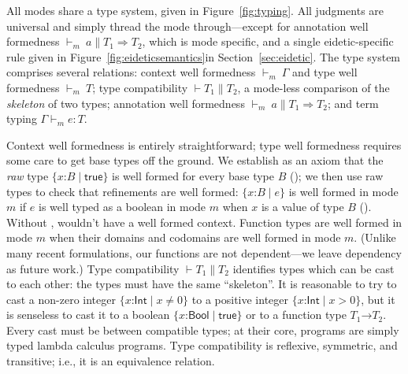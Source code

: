 \documentclass[9pt]{extarticle}
\newcommand{\ottnt}[1]{\mathit{#1}}
\newcommand{\ottsym}[1]{#1}
\begin{document}
All modes share a type system, given in
Figure~\ref{fig:typing}.
All judgments are universal and simply thread the mode
through---except for annotation well formedness $ \mathord{  \vdash _{ \ottnt{m} } }~ \ottnt{a}   \mathrel{\parallel}   \ottnt{T_{{\mathrm{1}}}}  \Rightarrow  \ottnt{T_{{\mathrm{2}}}} $, which is mode specific, and a single eidetic-specific rule
given in Figure~\ref{fig:eideticsemantics}\iffull in
Section~\ref{sec:eidetic}\fi.
The type system comprises several relations:
context well formedness $ \mathord{  \vdash _{ \ottnt{m} } }~ \Gamma $ and type well formedness $ \mathord{  \vdash _{ \ottnt{m} } }~ \ottnt{T} $; type compatibility $\vdash  \ottnt{T_{{\mathrm{1}}}}  \mathrel{\parallel}  \ottnt{T_{{\mathrm{2}}}}$, a mode-less comparison of
the \textit{skeleton} of two types; annotation well formedness $ \mathord{  \vdash _{ \ottnt{m} } }~ \ottnt{a}   \mathrel{\parallel}   \ottnt{T_{{\mathrm{1}}}}  \Rightarrow  \ottnt{T_{{\mathrm{2}}}} $; and term typing $ \Gamma   \vdash _{ \ottnt{m} }  \ottnt{e}  :  \ottnt{T} $.


Context well formedness is entirely straightforward; type well
formedness requires some care to get base types off the ground.
We establish as an axiom that the \textit{raw} type $ \{ \mathit{x} \mathord{:} \ottnt{B} \mathrel{\mid}  \mathsf{true}  \} $
  is well formed for every base type $\ottnt{B}$ (); we then use
  raw types to check that refinements are well formed: $ \{ \mathit{x} \mathord{:} \ottnt{B} \mathrel{\mid} \ottnt{e} \} $
  is well formed in mode $\ottnt{m}$ if $\ottnt{e}$ is well typed as a boolean
  in mode $\ottnt{m}$ when $\mathit{x}$ is a value of type $\ottnt{B}$
  (). Without ,  wouldn't have a well
  formed context. Function types are well formed in mode $\ottnt{m}$ when
  their domains and codomains are well formed in mode $\ottnt{m}$. (Unlike
  many recent formulations, our functions are not dependent---we leave
  dependency as future work.) 
Type compatibility $\vdash  \ottnt{T_{{\mathrm{1}}}}  \mathrel{\parallel}  \ottnt{T_{{\mathrm{2}}}}$ identifies types which can be
cast to each other: the types must have the same ``skeleton''. It is
reasonable to try to cast a non-zero integer $ \{ \mathit{x} \mathord{:}  \mathsf{Int}  \mathrel{\mid}  \mathit{x}  \mathrel{\ne}  \ottsym{0}  \} $ to a
positive integer $ \{ \mathit{x} \mathord{:}  \mathsf{Int}  \mathrel{\mid}  \mathit{x}  \mathrel{>} \ottsym{0}  \} $, but it is senseless to cast it
to a boolean $ \{ \mathit{x} \mathord{:}  \mathsf{Bool}  \mathrel{\mid}  \mathsf{true}  \} $ or to a function type $ \ottnt{T_{{\mathrm{1}}}} \mathord{ \rightarrow } \ottnt{T_{{\mathrm{2}}}} $.
Every cast must be between compatible types; at their core, \lambdah
programs are simply typed lambda calculus programs.
Type compatibility is reflexive, symmetric, and transitive; i.e., it
is an equivalence relation.
\end{document}
